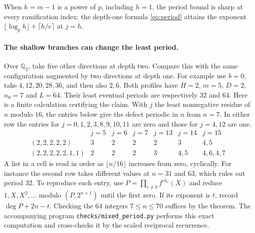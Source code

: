 When $h=m-1$ is a power of $p$, including $h=1$, the period bound is sharp at every ramification index: the depth-one formula \eqref{eq:period} attains the exponent $\lfloor\log_p h\rfloor+\lceil h/e\rceil$ at $j=h$.

\paragraph{The shallow branches can change the least period.}
Over $\mathbb Q_2$, take five other directions at depth two. Compare this
with the same configuration augmented by two directions at depth one.
For example use $b=0$, take $4,12,20,28,36$, and then also $2,6$.
Both profiles have $H=2$, $m=5$, $D=2$, $n_0=7$ and $L=64$.
Their least eventual periods are respectively $32$ and $64$.
Here is a finite calculation certifying the claim. With $j$ the least
nonnegative residue of $n$ modulo $16$, the entries below give the
defect periodic in $n$ from $n=7$. In either row the entries for
$j=0,1,2,3,8,9,10,11$ are zero and those for $j=4,12$ are one.
\[
\begin{array}{c|rrrrrr}
 & j=5&j=6&j=7&j=13&j=14&j=15\\\hline
 (2,2,2,2,2)&3&2&2&2&3&4,5\\
 (2,2,2,2,2,1,1)&2&2&2&3&4,5&4,6,4,7
\end{array}
\]
A list in a cell is read in order as $\lfloor n/16\rfloor$ increases from
zero, cyclically. For instance the second row takes different values at
$n=31$ and $63$, which rules out period $32$. To reproduce each entry, use
$P=\prod_{c\ne b} f^{\circ h_c}(X)$ and reduce $1,X,X^2,\ldots$ modulo
$(P,2^{n+1})$ until the first zero. If its exponent is $t$, record
$\deg P+2n-t$. Checking the 64 integers $7\le n\le70$ suffices by the
theorem. The accompanying program \texttt{checks/mixed\_period.py} performs
this exact computation and cross-checks it by the scaled reciprocal recurrence.
